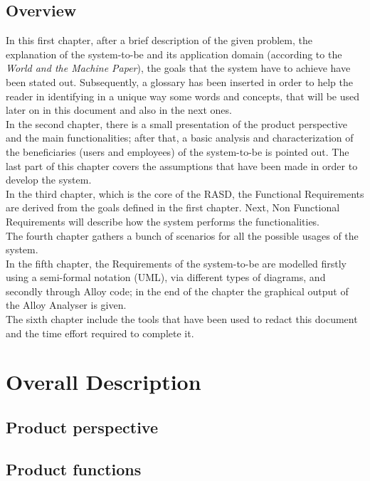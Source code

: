 \documentclass[11pt,a4paper]{report}
\begin{document}
\section{Overview}
In this first chapter, after a brief description of the given problem, the explanation of the system-to-be and its application domain (according to the \textit{World and the Machine Paper}), the goals that the system have to achieve have been stated out.
Subsequently, a glossary has been inserted in order to help the reader in identifying in a unique way some words and concepts, that will be used later on in this document and also in the next ones.\\
In the second chapter, there is a small presentation of the product perspective and the main functionalities; after that, a basic analysis and characterization of the beneficiaries (users and employees) of the system-to-be is pointed out. The last part of this chapter covers the assumptions that have been made in order to develop the system.\\
In the third chapter, which is the core of the RASD, the Functional Requirements are derived from the goals defined in the first chapter. Next, Non Functional Requirements will describe how the system performs the functionalities.\\
The fourth chapter gathers a bunch of scenarios for all the possible usages of the system.\\
In the fifth chapter, the Requirements of the system-to-be are modelled firstly using a semi-formal notation (UML), via different types of diagrams, and secondly through Alloy code; in the end of the chapter the graphical output of the Alloy Analyser is given.\\
The sixth chapter include the tools that have been used to redact this document and the time effort required to complete it.
\chapter{Overall Description}
\section{Product perspective}
\section{Product functions}
\end{document}
